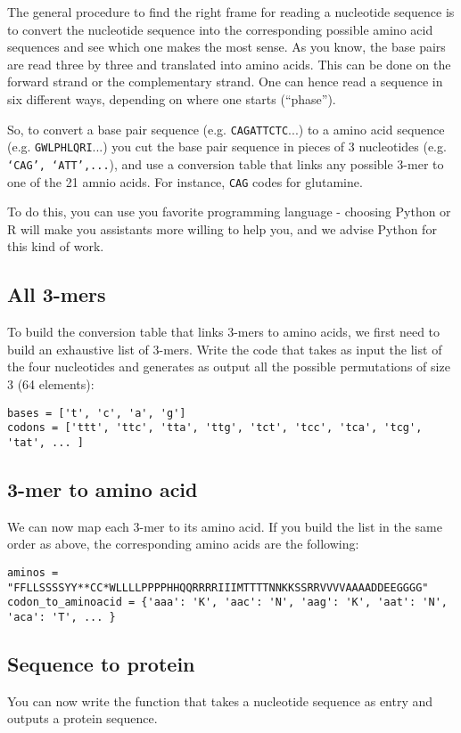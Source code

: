 \documentclass[a4paper,11pt]{article}
\begin{document}
The general procedure to find the right frame for reading a nucleotide sequence is to convert the nucleotide sequence into the corresponding possible amino acid sequences and see which one makes the most sense. As you know, the base pairs are read three by three and translated into amino acids. This can be done on the forward strand or the complementary strand. One can hence read a sequence in six different ways, depending on where one starts (``phase'').

So, to convert a base pair sequence (e.g. \texttt{CAGATTCTC}...) to a amino acid sequence (e.g. \texttt{GWLPHLQRI}...) you cut the base pair sequence in pieces of 3 nucleotides (e.g. \texttt{`CAG', `ATT',...}), and use a conversion table that links any possible 3-mer to one of the 21 amnio acids. For instance, \texttt{CAG} codes for glutamine.

To do this, you can use you favorite programming language - choosing Python or R will make you assistants more willing to help you, and we advise Python for this kind of work.

\subsection{All 3-mers}
To build the conversion table that links 3-mers to amino acids, we first need to build an exhaustive list of 3-mers. Write the code that takes as input the list of the four nucleotides and generates as output all the possible permutations of size 3 (64 elements):
	
\begin{verbatim}
bases = ['t', 'c', 'a', 'g']
codons = ['ttt', 'ttc', 'tta', 'ttg', 'tct', 'tcc', 'tca', 'tcg', 'tat', ... ]
\end{verbatim}

\subsection{3-mer to amino acid}
We can now map each 3-mer to its amino acid. If you build the list in the same order as above, the corresponding amino acids are the following:

\begin{verbatim}
aminos = "FFLLSSSSYY**CC*WLLLLPPPPHHQQRRRRIIIMTTTTNNKKSSRRVVVVAAAADDEEGGGG"
codon_to_aminoacid = {'aaa': 'K', 'aac': 'N', 'aag': 'K', 'aat': 'N', 'aca': 'T', ... }
\end{verbatim}

\subsection{Sequence to protein}
You can now write the function that takes a nucleotide sequence as entry and outputs a protein sequence.
\end{document}

